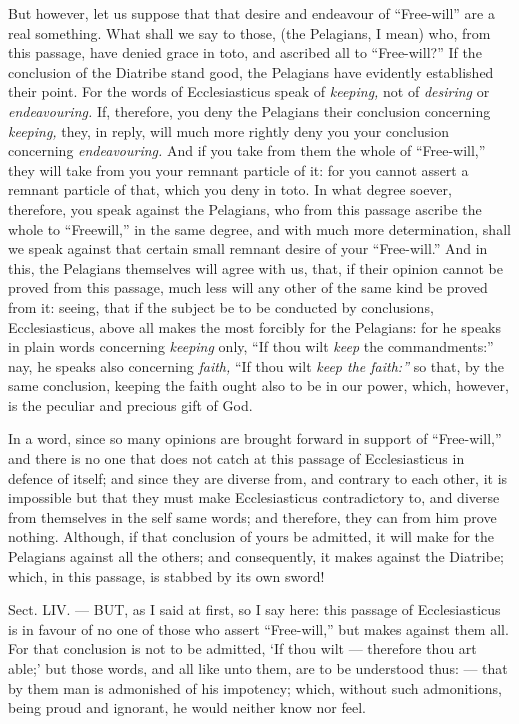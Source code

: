 But however, let us suppose that that desire and endeavour of “Free-will” are a real something. What shall we say to those, (the Pelagians, I mean) who, from this passage, have denied grace in toto, and ascribed all to “Free-will?” If the conclusion of the Diatribe stand good, the Pelagians have evidently established their point. For the words of Ecclesiasticus speak of \emph{keeping, }not of \emph{desiring }or \emph{endeavouring. } If, therefore, you deny the Pelagians their conclusion concerning \emph{keeping, }they, in reply, will much more rightly deny you your conclusion concerning \emph{endeavouring. }And if you take from them the whole of “Free-will,” they will take from you your remnant particle of it: for you cannot assert a remnant particle of that, which you deny in toto. In what degree soever, therefore, you speak against the Pelagians, who from this passage ascribe the whole to “Freewill,” in the same degree, and with much more determination, shall we speak against that certain small remnant desire of your “Free-will.” And in this, the Pelagians themselves will agree with us, that, if their opinion cannot be proved from this passage, much less will any other of the same kind be proved from it: seeing, that if the subject be to be conducted by conclusions, Ecclesiasticus, above all makes the most forcibly for the Pelagians: for he speaks in plain words concerning \emph{keeping }only, “If thou wilt \emph{keep }the commandments:” nay, he speaks also concerning \emph{faith, }“If thou wilt \emph{keep the faith:” }so that, by the same conclusion, keeping the faith ought also to be in our power, which, however, is the peculiar and precious gift of God.

In a word, since so many opinions are brought forward in support of “Free-will,” and there is no one that does not catch at this passage of Ecclesiasticus in defence of itself; and since they are diverse from, and contrary to each other, it is impossible but that they must make Ecclesiasticus contradictory to, and diverse from themselves in the self same words; and therefore, they can from him prove nothing. Although, if that conclusion of yours be admitted, it will make for the Pelagians against all the others; and consequently, it makes against the Diatribe; which, in this passage, is stabbed by its own sword!


Sect. LIV. — BUT, as I said at first, so I say here: this passage of Ecclesiasticus is in favour of no one of those who assert “Free-will,” but makes against them all. For that conclusion is not to be admitted, ‘If thou wilt — therefore thou art able;’ but those words, and all like unto them, are to be understood thus: — that by them man is admonished of his impotency; which, without such admonitions, being proud and ignorant, he would neither know nor feel.

